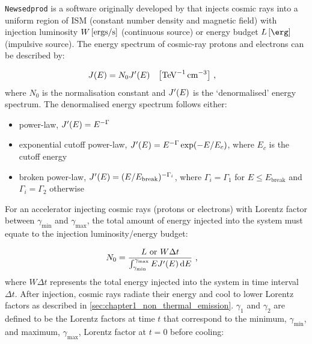 {\tt Newsedprod} is a software originally developed by \citep{fabien} that injects cosmic rays into a uniform region of ISM (constant number density and magnetic field) with injection luminosity $W\,\qty[\si{ergs\per\second}]$ (continuous source) or energy budget $L\,\qty[\ergs]$  (impulsive source). The energy spectrum of cosmic-ray protons and electrons can be described by:

\begin{equation}
    \begin{aligned}
  	  J\qty(E)&= N_0 J'\qty(E)\quad\qty[\si{\per\tera\electronvolt\per\centi\meter\cubed}]\text{ ,}
    \end{aligned}
\end{equation}
\noindent where $N_0$ is the normalisation constant and $J'\qty(E)$ is the `denormalised' energy spectrum. The denormalised energy spectrum follows either:

\begin{itemize}
    \itemsep0em 
    \item power-law, $J'\qty(E)=E^{-\Gamma}$
    \item exponential cutoff power-law, $J'\qty(E)=E^{-\Gamma}\exp(-E/E_c)$, where $E_c$ is the cutoff energy
    \item broken power-law, $J'\qty(E)=(E/E_\text{break})^{-\Gamma_i}$, where $\Gamma_i=\Gamma_1$ for $E\leq E_\text{break}$ and $\Gamma_i = \Gamma_2$ otherwise
\end{itemize}

\noindent For an accelerator injecting cosmic rays (protons or electrons) with Lorentz factor between $\gamma_\text{min}$ and $\gamma_\text{max}$, the total amount of energy injected into the system must equate to the injection luminosity/energy budget:

\begin{equation}
    \begin{aligned}
 	   N_0&=\frac{L\text{ or }W\Delta t}{\int_{\gamma_\text{min}}^{\gamma_\text{max}} EJ'\qty(E)\dd{E}}\text{ ,}
    \end{aligned} \label{eq:chapter_7_energy_budget}
\end{equation}
\noindent where $W\Delta t$ represents the total energy injected into the system in time interval $\Delta t$.
\newpar
After injection, cosmic rays radiate their energy and cool to lower Lorentz factors as described in \autoref{sec:chapter1_non_thermal_emission}. $\gamma_1$ and $\gamma_2$ are defined to be the Lorentz factors at time $t$ that correspond to the minimum, $\gamma_\text{min}$, and maximum, $\gamma_\text{max}$, Lorentz factor at $t=0$ before cooling:

